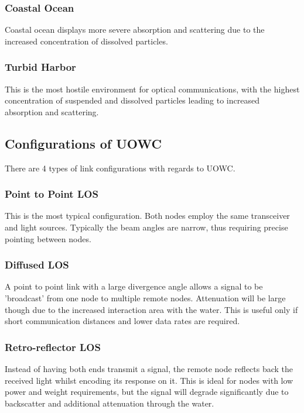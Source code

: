 \documentclass{article}
\begin{document}
\subsubsection{Coastal Ocean}
Coastal ocean displays more severe absorption and scattering due to the increased concentration of dissolved particles.

\subsubsection{Turbid Harbor}
This is the most hostile environment for optical communications, with the highest concentration of suspended and dissolved particles leading to increased absorption and scattering.




\subsection{Configurations of UOWC}
There are 4 types of link configurations with regards to \ac{UOWC}.

\subsubsection{Point to Point \ac{LOS}}
This is the most typical configuration. Both nodes employ the same transceiver and light sources. Typically the beam angles are narrow, thus requiring precise pointing between nodes.

\subsubsection{Diffused \ac{LOS}}
A point to point link with a large divergence angle allows a signal to be 'broadcast' from one node to multiple remote nodes. Attenuation will be large though due to the increased interaction area with the water. This is useful only if short communication distances and lower data rates are required.

\subsubsection{Retro-reflector \ac{LOS}}

Instead of having both ends transmit a signal, the remote node reflects back the received light whilst encoding its response on it. This is ideal for nodes with low power and weight requirements, but the signal will degrade significantly due to backscatter and additional attenuation through the water.
\end{document}
